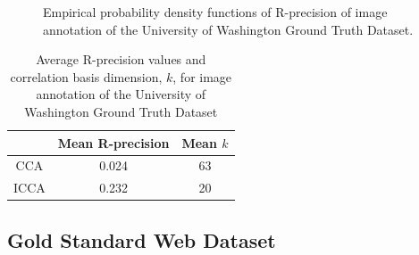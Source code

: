 \begin{figure}[t]
  \centering
  \caption{Empirical probability density functions of R-precision of image annotation of
    the University of Washington Ground Truth Dataset.}
  \label{fig:chpt9:gt_rprec}
\end{figure}

\begin{table}[t]
\centering
\begin{tabular}{c||c|c}
& Mean R-precision& Mean $k$\\ \hline
CCA &  0.024& 63\\
ICCA & 0.232& 20\\
\bottomrule
\end{tabular}
\caption{Average R-precision values and correlation basis dimension, $k$, for image
  annotation of the University of Washington  Ground Truth Dataset }
\label{table:rprec}
\vspace{-0.1in}
\end{table}

\subsection{Gold Standard Web Dataset}

